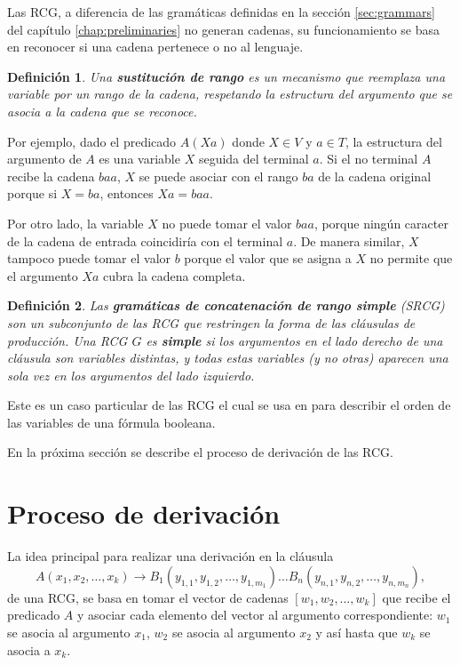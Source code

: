 \documentclass[12pt]{article}
\newtheorem{definition}{Definición}
\begin{document}
Las RCG, a diferencia de las gramáticas definidas en la sección \ref{sec:grammars} del capítulo \ref{chap:preliminaries} no generan cadenas, su funcionamiento se basa en reconocer si una cadena pertenece o no al lenguaje.


\begin{definition}
    Una \textbf{sustitución de rango} es un mecanismo que reemplaza una variable por un 
    rango de la cadena, respetando la estructura del argumento que se asocia a la cadena que se reconoce. 
\end{definition}

Por ejemplo, dado el predicado $A(Xa)$ donde $X \in V$ y $a \in T$, la estructura del argumento de $A$ es una variable $X$ seguida del terminal $a$. Si el no terminal $A$ recibe la cadena $baa$, $X$ se puede asociar con el rango $ba$ de la cadena original porque si $X=ba$, entonces $Xa=baa$.

Por otro lado, la variable $X$ no puede tomar el valor $baa$, porque ningún caracter de la cadena de entrada coincidiría 
con el terminal $a$. De manera similar, $X$ tampoco puede tomar el valor $b$ porque el valor que se asigna a $X$ no permite que el argumento $Xa$ cubra la cadena completa.

\begin{definition}
    Las \textbf{gramáticas de concatenación de rango simple}
    (\textit{SRCG}) son un subconjunto de las RCG que restringen la forma de las cláusulas de producción.  
    Una RCG $G$ es \textbf{simple} si los argumentos en el lado derecho de una cláusula son variables distintas, 
    y todas estas variables (y no otras) aparecen una sola vez en los argumentos del lado izquierdo.  
\end{definition}

Este es un caso particular de las RCG el cual se usa en \cite{aSRCSAT} para describir el orden de las variables de una fórmula booleana. 

En la próxima sección se describe el proceso de derivación de las RCG.

\section{Proceso de derivación}

La idea principal para realizar una derivación en la cláusula 
\[
    A(x_1, x_2, \ldots, x_k) \to B_1(y_{1,1}, y_{1,2}, \ldots, y_{1,m_1}) \ldots B_n(y_{n,1}, y_{n,2}, \ldots, y_{n,m_n}),
\]
de una RCG, se basa en tomar el vector de cadenas $[w_1, w_2,\ldots, w_k]$ que recibe el predicado $A$ y asociar cada elemento del vector al argumento 
correspondiente: $w_1$ se asocia al argumento $x_1$, $w_2$ se asocia al argumento $x_2$ y así hasta que 
$w_k$ se asocia a $x_k$. 
\end{document}
